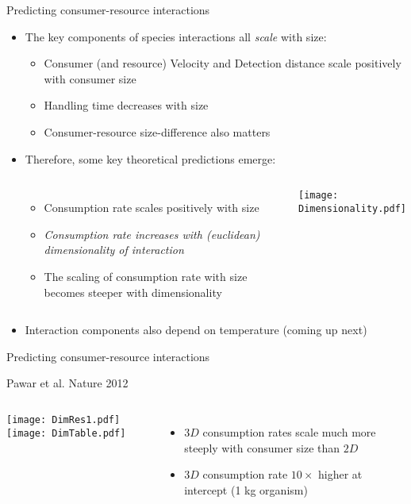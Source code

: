   \begin{frame}{Predicting consumer-resource interactions}

  \begin{itemize}[<+->] \setlength{\itemindent}{-1em}
    \item The key components of species interactions all {\it scale} with size:\par 
    \begin{itemize}
      \item Consumer (and resource) Velocity and Detection distance scale positively with consumer size
      \item Handling time decreases with size
      \item Consumer-resource size-difference also matters
    \end{itemize}
    \item Therefore, some key theoretical predictions emerge:\par
    \begin{columns}
      \centering
        \begin{itemize}\setlength{\itemindent}{0em} \itemsep2pt
          \item Consumption rate scales positively with size 
          \item \it Consumption rate increases with (euclidean) dimensionality of interaction
          \item The scaling of consumption rate with size becomes steeper with dimensionality
      \end{itemize} 
       \centering
      \texttt{[image: Dimensionality.pdf]}
  \end{columns}
  \item Interaction components also depend on temperature (coming up next)
\end{itemize}

\end{frame}
  
\begin{frame}{Predicting consumer-resource interactions}

\begin{center}
  {\tiny Pawar et al. Nature 2012}
\end{center}

\begin{columns}
   \centering
    \texttt{[image: DimRes1.pdf]}
   \centering
    \texttt{[image: DimTable.pdf]}
    \begin{itemize}\setlength{\itemindent}{-1em}
       \item 3$D$ consumption rates scale much more steeply with consumer size than $2D$
       \item 3$D$ consumption rate $10\times$ higher at intercept (1 kg organism)
    \end{itemize}
\end{columns}

\end{frame}
 
